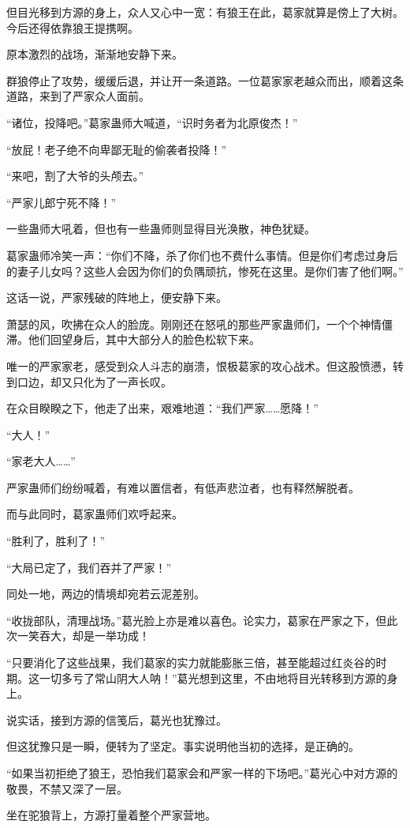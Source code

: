\begin{this_body}
但目光移到方源的身上，众人又心中一宽：有狼王在此，葛家就算是傍上了大树。今后还得依靠狼王提携啊。

原本激烈的战场，渐渐地安静下来。

群狼停止了攻势，缓缓后退，并让开一条道路。一位葛家家老越众而出，顺着这条道路，来到了严家众人面前。

“诸位，投降吧。”葛家蛊师大喊道，“识时务者为北原俊杰！”

“放屁！老子绝不向卑鄙无耻的偷袭者投降！”

“来吧，割了大爷的头颅去。”

“严家儿郎宁死不降！”

一些蛊师大吼着，但也有一些蛊师则显得目光涣散，神色犹疑。

葛家蛊师冷笑一声：“你们不降，杀了你们也不费什么事情。但是你们考虑过身后的妻子儿女吗？这些人会因为你们的负隅顽抗，惨死在这里。是你们害了他们啊。”

这话一说，严家残破的阵地上，便安静下来。

萧瑟的风，吹拂在众人的脸庞。刚刚还在怒吼的那些严家蛊师们，一个个神情僵滞。他们回望身后，其中大部分人的脸色松软下来。

唯一的严家家老，感受到众人斗志的崩溃，恨极葛家的攻心战术。但这股愤懑，转到口边，却又只化为了一声长叹。

在众目睽睽之下，他走了出来，艰难地道：“我们严家……愿降！”

“大人！”

“家老大人……”

严家蛊师们纷纷喊着，有难以置信者，有低声悲泣者，也有释然解脱者。

而与此同时，葛家蛊师们欢呼起来。

“胜利了，胜利了！”

“大局已定了，我们吞并了严家！”

同处一地，两边的情境却宛若云泥差别。

“收拢部队，清理战场。”葛光脸上亦是难以喜色。论实力，葛家在严家之下，但此次一笑吞大，却是一举功成！

“只要消化了这些战果，我们葛家的实力就能膨胀三倍，甚至能超过红炎谷的时期。这一切多亏了常山阴大人呐！”葛光想到这里，不由地将目光转移到方源的身上。

说实话，接到方源的信笺后，葛光也犹豫过。

但这犹豫只是一瞬，便转为了坚定。事实说明他当初的选择，是正确的。

“如果当初拒绝了狼王，恐怕我们葛家会和严家一样的下场吧。”葛光心中对方源的敬畏，不禁又深了一层。

坐在驼狼背上，方源打量着整个严家营地。


\end{this_body}
